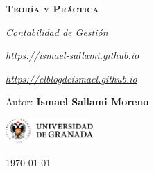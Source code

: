 \documentclass[12pt]{report} %
\begin{document}
\begin{titlepage}
    \begin{center}
        \vspace*{2cm}
        
        {\Huge \bfseries\scshape Teoría y Práctica \par}
        \vspace{0.5cm}
        {\Large \itshape Contabilidad de Gestión \par}
        \vspace{0.5cm}
        {\small \itshape \href{https://ismael-sallami.github.io}{https://ismael-sallami.github.io} \par}
        {\small \itshape \href{https://elblogdeismael.github.io}{https://elblogdeismael.github.io} \par}


        \vfill
        
        {\LARGE Autor: \textbf{Ismael Sallami Moreno} \par}
        \vspace{0.3cm}
        
        \vspace{1cm}
        \includegraphics[width=0.25\textwidth]{../../../extraFiles/img/ugr.png} %
        \vspace{1cm}
        
        {\large \today}
    \end{center}
    
    \restoregeometry
\end{titlepage}


\thispagestyle{empty} %
\clearpage

\tableofcontents
\listoffigures
\clearpage

\listoftables
\clearpage
\thispagestyle{empty} %
\clearpage

\renewcommand{\lstlistlistingname}{Índice de Código}
\lstlistoflistings
\clearpage

\renewcommand{\listtheoremname}{Índice de Ecuaciones}
\listoftheorems[ignoreall,show={equation}]
\clearpage
\end{document}
